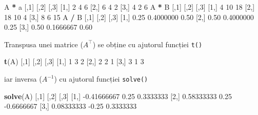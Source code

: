 \documentclass[]{article}
\newenvironment{Shaded}{\begin{snugshade}}{\end{snugshade}}
\newcommand{\DecValTok}[1]{\textcolor[rgb]{0.00,0.00,0.81}{#1}}
\newcommand{\FloatTok}[1]{\textcolor[rgb]{0.00,0.00,0.81}{#1}}
\newcommand{\KeywordTok}[1]{\textcolor[rgb]{0.13,0.29,0.53}{\textbf{#1}}}
\newcommand{\NormalTok}[1]{#1}
\newcommand{\OperatorTok}[1]{\textcolor[rgb]{0.81,0.36,0.00}{\textbf{#1}}}
\newcommand{\StringTok}[1]{\textcolor[rgb]{0.31,0.60,0.02}{#1}}
\begin{document}
\begin{Shaded}
\begin{Highlighting}[]
\NormalTok{A }\OperatorTok{*}\StringTok{ }\NormalTok{a}
\NormalTok{     [,}\DecValTok{1}\NormalTok{] [,}\DecValTok{2}\NormalTok{] [,}\DecValTok{3}\NormalTok{]}
\NormalTok{[}\DecValTok{1}\NormalTok{,]    }\DecValTok{2}    \DecValTok{4}    \DecValTok{6}
\NormalTok{[}\DecValTok{2}\NormalTok{,]    }\DecValTok{6}    \DecValTok{4}    \DecValTok{2}
\NormalTok{[}\DecValTok{3}\NormalTok{,]    }\DecValTok{4}    \DecValTok{2}    \DecValTok{6}
\NormalTok{A }\OperatorTok{*}\StringTok{ }\NormalTok{B}
\NormalTok{     [,}\DecValTok{1}\NormalTok{] [,}\DecValTok{2}\NormalTok{] [,}\DecValTok{3}\NormalTok{]}
\NormalTok{[}\DecValTok{1}\NormalTok{,]    }\DecValTok{4}   \DecValTok{10}   \DecValTok{18}
\NormalTok{[}\DecValTok{2}\NormalTok{,]   }\DecValTok{18}   \DecValTok{10}    \DecValTok{4}
\NormalTok{[}\DecValTok{3}\NormalTok{,]    }\DecValTok{8}    \DecValTok{6}   \DecValTok{15}
\NormalTok{A }\OperatorTok{/}\StringTok{ }\NormalTok{B}
\NormalTok{     [,}\DecValTok{1}\NormalTok{]      [,}\DecValTok{2}\NormalTok{] [,}\DecValTok{3}\NormalTok{]}
\NormalTok{[}\DecValTok{1}\NormalTok{,] }\FloatTok{0.25} \FloatTok{0.4000000} \FloatTok{0.50}
\NormalTok{[}\DecValTok{2}\NormalTok{,] }\FloatTok{0.50} \FloatTok{0.4000000} \FloatTok{0.25}
\NormalTok{[}\DecValTok{3}\NormalTok{,] }\FloatTok{0.50} \FloatTok{0.1666667} \FloatTok{0.60}
\end{Highlighting}
\end{Shaded}

Transpusa unei matrice (\(A^\intercal\)) se obține cu ajutorul funcției
\texttt{t()}

\begin{Shaded}
\begin{Highlighting}[]
\KeywordTok{t}\NormalTok{(A)}
\NormalTok{     [,}\DecValTok{1}\NormalTok{] [,}\DecValTok{2}\NormalTok{] [,}\DecValTok{3}\NormalTok{]}
\NormalTok{[}\DecValTok{1}\NormalTok{,]    }\DecValTok{1}    \DecValTok{3}    \DecValTok{2}
\NormalTok{[}\DecValTok{2}\NormalTok{,]    }\DecValTok{2}    \DecValTok{2}    \DecValTok{1}
\NormalTok{[}\DecValTok{3}\NormalTok{,]    }\DecValTok{3}    \DecValTok{1}    \DecValTok{3}
\end{Highlighting}
\end{Shaded}

iar inversa (\(A^{-1}\)) cu ajutorul funcției \texttt{solve()}

\begin{Shaded}
\begin{Highlighting}[]
\KeywordTok{solve}\NormalTok{(A)}
\NormalTok{            [,}\DecValTok{1}\NormalTok{]  [,}\DecValTok{2}\NormalTok{]       [,}\DecValTok{3}\NormalTok{]}
\NormalTok{[}\DecValTok{1}\NormalTok{,] }\FloatTok{-0.41666667}  \FloatTok{0.25}  \FloatTok{0.3333333}
\NormalTok{[}\DecValTok{2}\NormalTok{,]  }\FloatTok{0.58333333}  \FloatTok{0.25} \FloatTok{-0.6666667}
\NormalTok{[}\DecValTok{3}\NormalTok{,]  }\FloatTok{0.08333333} \FloatTok{-0.25}  \FloatTok{0.3333333}
\end{Highlighting}
\end{Shaded}
\end{document}
